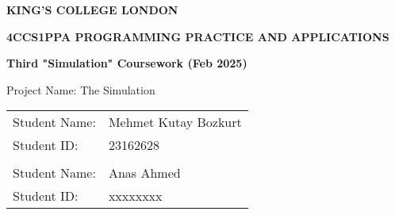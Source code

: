 \documentclass[12pt, a4paper]{scrartcl}
\begin{document}

\begin{titlepage}
  \begin{center}
    \LARGE
      \textbf{KING'S COLLEGE LONDON}

      \vspace{2cm}

      \begin{adjustwidth}{-1cm}{-1cm}
        \centering
        \Large
        \textbf{4CCS1PPA PROGRAMMING PRACTICE AND APPLICATIONS}
      \end{adjustwidth}
      
      \vspace{0.5cm}

      \Large
      \textbf{Third "Simulation" Coursework (Feb 2025)}

      \vspace{2cm}

      \Large
      Project Name: The Simulation 

      \vspace{1cm}

      \Large
      \begin{tabular}{l l}
        Student Name: & Mehmet Kutay Bozkurt \\
        Student ID: & 23162628 \\
        \vspace{0.5cm} & \\
        Student Name: & Anas Ahmed \\
        Student ID: & xxxxxxxx
      \end{tabular}
  \end{center}
\end{titlepage}
\end{document}
